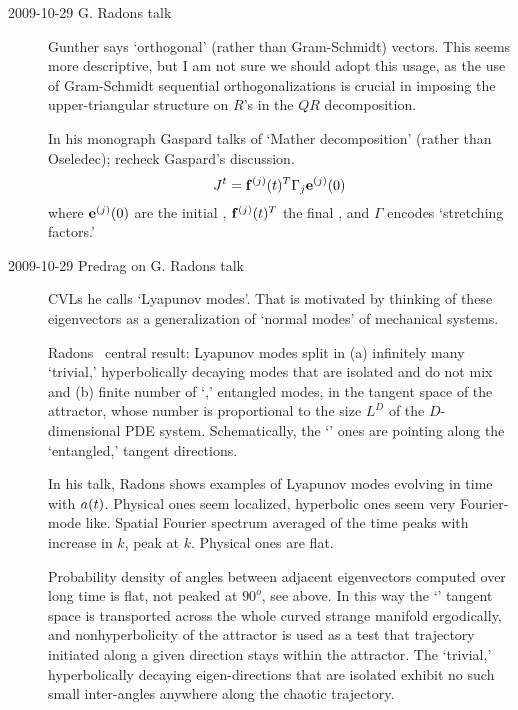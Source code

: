 \begin{description}

\item[2009-10-29 G. Radons talk]  Gunther says `orthogonal'
(rather than Gram-Schmidt) vectors. This seems more
descriptive, but I am not sure we should adopt this usage, as
the use of Gram-Schmidt sequential orthogonalizations is
crucial in imposing the upper-triangular structure on $R$'s in
the $QR$ decomposition.

In his monograph Gaspard talks of `Mather
decomposition' (rather than Oseledec); recheck Gaspard's
discussion.
\[
J^t = {\bf f}^{(j)}(t){}^T \Gamma_j {\bf e}^{(j)}(0)
\]
where ${\bf e}^{(j)}(0)$ are the initial {\cLvs},
${\bf f}^{(j)}(t){}^T$ the final {\cLvs}, and $\Gamma$ encodes
`stretching factors.'

\item[2009-10-29 Predrag on G. Radons talk]
CVLs he calls  `Lyapunov modes'. That is
motivated by thinking of these eigenvectors as a generalization
of `normal modes' of mechanical systems.						\inCB

Radons \etal\ central result: Lyapunov modes split in (a)
infinitely many `trivial,' hyperbolically decaying modes that
are isolated and do not mix and (b) finite number of
`{\entangled},' entangled modes, in the tangent space of the
attractor, whose number is proportional to the size $L^D$ of
the $D$-dimensional PDE system. Schematically, the `{\entangled}'
ones are pointing along the `entangled,' {\entangled} tangent
directions.

In his talk, Radons shows examples of Lyapunov modes evolving
in time with $a(t)$. Physical ones seem localized,
hyperbolic ones seem very Fourier-mode like. Spatial Fourier
spectrum averaged of the time peaks with increase in $k$, peak
at $k$. Physical ones are flat.

Probability density of angles between adjacent {\entangled}
eigenvectors computed over long time is flat, not peaked at
$90^o$, see  above. In this way the
`{\entangled}' tangent space is transported across the whole curved
strange manifold ergodically, and nonhyperbolicity of the
attractor is used as a test that trajectory initiated along a
given direction stays within the attractor. The `trivial,'
hyperbolically decaying eigen-directions that are isolated
exhibit no such small inter-angles anywhere along the chaotic
trajectory.


\end{description}
